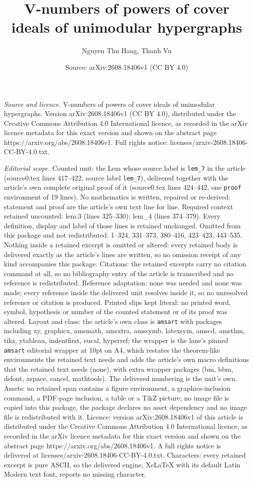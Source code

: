 \documentclass[10pt,a4paper]{amsart}
\title[V-numbers of powers of cover ideals of unimodular hypergraph]{V-numbers of powers of cover ideals of unimodular hypergraphs}
\author{Nguyen Thu Hang, Thanh Vu}
\date{Source: arXiv:2608.18406v1 (CC BY 4.0)}
\begin{document}
\maketitle

\noindent\emph{Source and licence.} V-numbers of powers of cover ideals of unimodular hypergraphs. Version arXiv:2608.18406v1 (CC BY 4.0), distributed under the Creative Commons Attribution 4.0 International licence, as recorded in the arXiv licence metadata for this exact version and shown on the abstract page https://arxiv.org/abs/2608.18406v1. Full rights notice: licenses/arxiv-2608.18406-CC-BY-4.0.txt.\par\smallskip

\noindent\textit{Editorial scope.} Counted unit: the Lem whose source label is \texttt{lem\_7} in the article (source0.tex lines 417--422, source label \texttt{lem\_7}), delivered together with the article's own complete original proof of it (source0.tex lines 424--442, one \texttt{proof} environment of 19 lines). No mathematics is written, repaired or re-derived: statement and proof are the article's own text line for line. Required context retained uncounted: lem:3 (lines 325--330); lem\_4 (lines 374--379). Every definition, display and label of those lines is retained unchanged. Omitted from this package and not redistributed: 1--324, 331--373, 380--416, 423--423, 443--535. Nothing inside a retained excerpt is omitted or altered: every retained body is delivered exactly as the article's lines are written, so no omission receipt of any kind accompanies this package. Citations: the retained excerpts carry no citation command at all, so no bibliography entry of the article is transcribed and no reference is redistributed. Reference adaptation: none was needed and none was made; every reference inside the delivered unit resolves inside it, so no unresolved reference or citation is produced. Printed slips kept literal: no printed word, symbol, hypothesis or number of the counted statement or of its proof was altered. Layout and class: the article's own class is \texttt{amsart} with packages including xy, graphicx, amsmath, amsxtra, amssymb, latexsym, amscd, amsthm, tikz, ytableau, indentfirst, eucal, hyperref; the wrapper is the lane's pinned \texttt{amsart} editorial wrapper at 10pt on A4, which restates the theorem-like environments the retained text needs and adds the article's own macro definitions that the retained text needs (none), with extra wrapper packages (bm, bbm, dsfont, xspace, cancel, mathtools). The delivered numbering is the unit's own. Assets: no retained span contains a figure environment, a graphics-inclusion command, a PDF-page inclusion, a table or a TikZ picture; no image file is copied into this package, the package declares no asset dependency and no image file is redistributed with it. Licence: version arXiv:2608.18406v1 of this article is distributed under the Creative Commons Attribution 4.0 International licence, as recorded in the arXiv licence metadata for this exact version and shown on the abstract page https://arxiv.org/abs/2608.18406v1. A full rights notice is delivered at licenses/arxiv-2608.18406-CC-BY-4.0.txt. Characters: every retained excerpt is pure ASCII, so the delivered engine, XeLaTeX with its default Latin Modern text font, reports no missing character.
\end{document}
